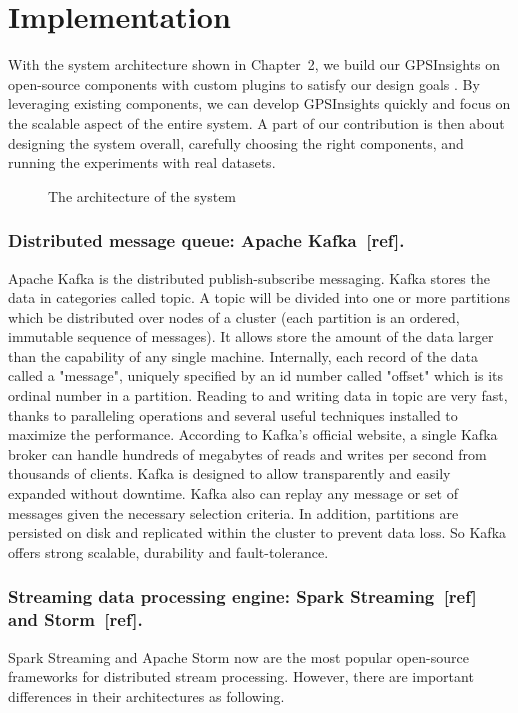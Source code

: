 \documentclass{acm_proc_article-sp}
\begin{document}
\section{Implementation} 

With the system architecture shown in Chapter~2, we build our GPSInsights on open-source components with custom plugins to satisfy our design goals . By leveraging existing components, we can develop GPSInsights quickly and focus on the scalable aspect of the entire system. A part of our contribution is then about designing the system overall,  carefully choosing the right components, and running the experiments with real datasets. 

\begin{figure}[!htb]
\centering
{}
\caption{The architecture of the system}
\end{figure}

\subsubsection{Distributed message queue: Apache Kafka~[ref].} Apache Kafka is the distributed publish-subscribe messaging. Kafka stores the data in categories called topic. A topic will be divided into one or more partitions which be distributed over nodes of a cluster (each partition is an ordered, immutable sequence of messages). It allows store the amount of the data larger than the capability of any single machine. Internally, each record of the data called a "message", uniquely specified by an id number called "offset" which is its ordinal number in a partition. 
Reading to and writing data in topic are very fast, thanks to paralleling operations and several useful techniques installed to maximize the performance. According to Kafka's official website, a single Kafka broker can handle hundreds of megabytes of reads and writes per second from thousands of clients.
Kafka is designed to allow transparently and easily expanded without downtime. Kafka also can replay any message or set of messages given the necessary selection  criteria. In addition, partitions are persisted on disk and replicated within the cluster to prevent data loss. So Kafka offers strong scalable, durability and  fault-tolerance.

\subsubsection{Streaming data processing engine: Spark Streaming~[ref] and Storm~[ref].}
Spark Streaming and Apache Storm now are the most popular open-source frameworks for distributed stream processing. However, there are important differences in their architectures as following.
\end{document}

